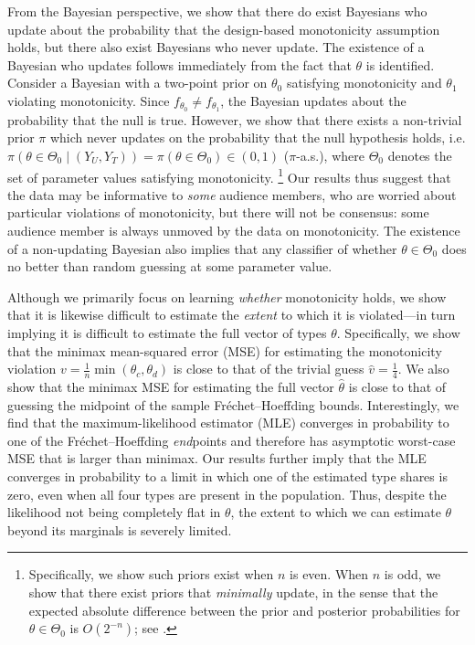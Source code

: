 \documentclass[12pt,reqno]{amsart}
\theoremstyle{theorem}
\theoremstyle{definition}
\newcommand{\0}{\mathbf{0}}
\newcommand{\1}{\mathbf{1}}
\begin{document}
From the Bayesian perspective, we show that there do exist Bayesians who update about
the probability that the design-based monotonicity assumption holds, but there also exist
Bayesians who never update. The existence of a Bayesian who updates follows immediately
from the fact that $\theta$ is identified. Consider a Bayesian with a two-point prior on
$\theta_0$ satisfying monotonicity and $\theta_1$ violating monotonicity. Since
$f_{\theta_0} \neq f_{\theta_1}$, the Bayesian updates about the probability that the null
is true. However, we show that there exists a non-trivial prior $\pi$ which never
updates on the probability that the null hypothesis holds, i.e. $\pi(\theta \in \Theta_0
\mid (Y_U,Y_T) ) = \pi(\theta \in \Theta_0) \in (0,1)$ ($\pi$-a.s.), where $\Theta_0$ denotes
the set of parameter values satisfying monotonicity.%
\footnote{Specifically, we show such priors exist when $n$ is even. When $n$ is odd, we show that there exist priors that \emph{minimally} update, in the sense that the expected absolute difference between the prior and posterior probabilities for $\theta \in \Theta_0$ is $O(2^{-n})$; see .}
Our results thus suggest that the data may be
informative to \emph{some} audience members, who are worried about particular violations
of monotonicity, but there will not be consensus: some audience member is always unmoved by the data on monotonicity. The existence of a non-updating Bayesian also implies that any classifier of whether $\theta \in \Theta_0$ does no better than random guessing at some parameter value. 

Although we primarily focus on learning \emph{whether} monotonicity holds, we show that it is likewise difficult to estimate the \emph{extent} to which it is violated---in turn implying it is difficult to estimate the full vector of types $\theta$. Specifically, we show that the minimax mean-squared error (MSE) for estimating the monotonicity violation $v = \frac{1}{n} \min(\theta_c, \theta_d)$ is close to that of the trivial guess $\hat{v} = \frac{1}{4}$. We also show that the minimax MSE for estimating the full vector $\hat\theta$ is close to that of guessing the midpoint of the sample Fr\'echet--Hoeffding bounds. Interestingly, we find that the maximum-likelihood estimator (MLE) converges in probability to one of the Fr\'echet--Hoeffding \emph{end}points and therefore has asymptotic worst-case MSE that is larger than minimax. Our results further imply that the MLE converges in probability to a limit in which one of the estimated type shares is zero, even when all four types are present in the population. Thus, despite the likelihood not being completely flat in $\theta$, the extent to which we can estimate $\theta$ beyond its marginals is severely limited.
\end{document}
